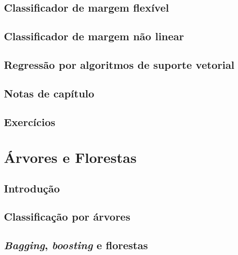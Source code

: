 \documentclass[
]{latex/krantz}
\theoremstyle{definition}
\theoremstyle{definition}
\theoremstyle{definition}
\theoremstyle{definition}
\theoremstyle{remark}
\begin{document}
\hypertarget{classificador-de-margem-flexuxedvel}{%
\section{Classificador de margem flexível}\label{classificador-de-margem-flexuxedvel}}

\hypertarget{classificador-de-margem-nuxe3o-linear}{%
\section{Classificador de margem não linear}\label{classificador-de-margem-nuxe3o-linear}}

\hypertarget{regressuxe3o-por-algoritmos-de-suporte-vetorial}{%
\section{Regressão por algoritmos de suporte vetorial}\label{regressuxe3o-por-algoritmos-de-suporte-vetorial}}

\hypertarget{notas-de-capuxedtulo-8}{%
\section{Notas de capítulo}\label{notas-de-capuxedtulo-8}}

\hypertarget{exercuxedcios-8}{%
\section{Exercícios}\label{exercuxedcios-8}}

\hypertarget{uxe1rvores-e-florestas}{%
\chapter{Árvores e Florestas}\label{uxe1rvores-e-florestas}}

\hypertarget{introduuxe7uxe3o-9}{%
\section{Introdução}\label{introduuxe7uxe3o-9}}

\hypertarget{classificauxe7uxe3o-por-uxe1rvores}{%
\section{Classificação por árvores}\label{classificauxe7uxe3o-por-uxe1rvores}}

\hypertarget{bagging-boosting-e-florestas}{%
\section{\texorpdfstring{\emph{Bagging}, \emph{boosting} e florestas}{Bagging, boosting e florestas}}\label{bagging-boosting-e-florestas}}
\end{document}
